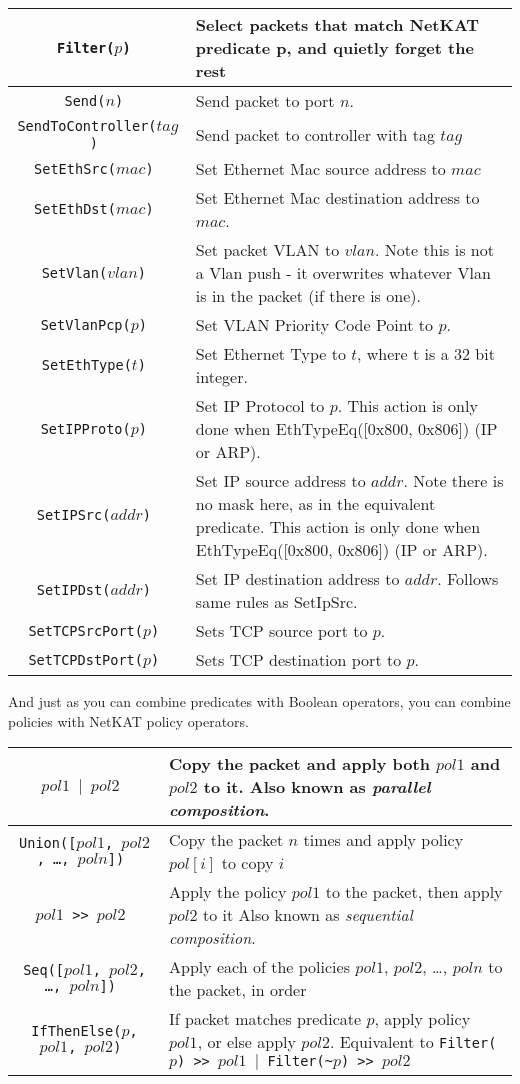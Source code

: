 \bigskip
\begin{tabularx}{6in}{|c|X|}
\hline\hline
\tt{Filter($p$)} & Select packets that match NetKAT predicate p, and quietly forget the rest  
\\ \hline
\tt{Send($n$)} & Send packet to port $n$.    
\\ \hline
\tt{SendToController($tag$)} & Send packet to controller with tag $tag$    
\\ \hline
\tt{SetEthSrc($mac$)} & Set Ethernet Mac source address to $mac$
\\ \hline
\tt{SetEthDst($mac$)} & Set Ethernet Mac destination address to $mac$.
\\ \hline
\tt{SetVlan($vlan$)} & Set packet VLAN to $vlan$.  Note this is not a Vlan push - it overwrites whatever 
Vlan is in the packet (if there is one).  
\\ \hline
\tt{SetVlanPcp($p$)} & Set VLAN Priority Code Point to $p$.
\\ \hline
\tt{SetEthType($t$)} & Set Ethernet Type to $t$, where t is a 32 bit integer.
\\ \hline
\tt{SetIPProto($p$)} & Set IP Protocol to $p$.    
This action is only done when EthTypeEq([0x800, 0x806]) (IP or ARP). 
\\ \hline
\tt{SetIPSrc($addr$)} & Set IP source address to $addr$.  Note there is no mask here, as in the equivalent predicate.  
This action is only done when EthTypeEq([0x800, 0x806]) (IP or ARP). 
\\ \hline
\tt{SetIPDst($addr$)} & Set IP destination address to $addr$.  
Follows same rules as SetIpSrc.
\\ \hline
\tt{SetTCPSrcPort($p$)} & Sets TCP source port to $p$.
\\ \hline
\tt{SetTCPDstPort($p$)} & Sets TCP destination port to $p$.  
\\ \hline\hline
\end{tabularx}
\bigskip

And just as you can combine predicates with Boolean operators, you can combine policies with NetKAT 
policy operators.

\bigskip
\begin{tabularx}{6in}{|c|X|}
\hline\hline
\tt{$pol1$ $\vert$ $pol2$} & Copy the packet and apply both $pol1$ and $pol2$ to it.   
Also known as \textit{parallel composition}.
\\ \hline  
\tt{Union([$pol1$, $pol2$, \ldots, $poln$])} & 
Copy the packet $n$ times and apply policy $pol[i]$ to copy $i$
\\ \hline  
\tt{$pol1$ >> $pol2$} & Apply the policy $pol1$ to the packet, then apply $pol2$ to it
Also known as \textit{sequential composition}.
\\ \hline  
\tt{Seq([$pol1$, $pol2$, \ldots, $poln$])} & 
Apply each of the policies $pol1$, $pol2$, \ldots, $poln$ to the packet, in order 
\\ \hline  
\tt{IfThenElse($p$, $pol1$, $pol2$)} & If packet matches predicate $p$, apply policy $pol1$, or else
apply $pol2$.  Equivalent to \tt{Filter($p$) >> $pol1$ $\vert$ Filter(\textasciitilde$p$) >> $pol2$}
\\ \hline\hline
\end{tabularx}

